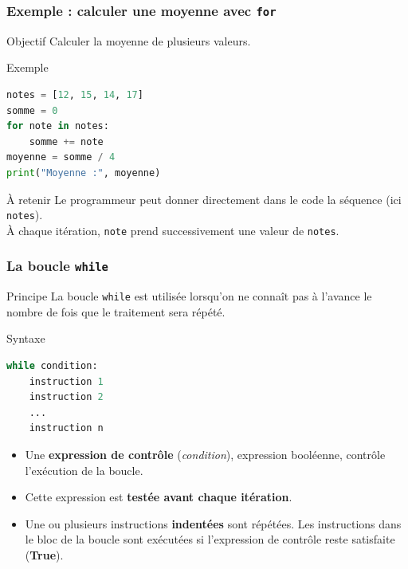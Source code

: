 \documentclass[10pt]{beamer}
\begin{document}
\begin{frame}[containsverbatim]
	\frametitle{Exemple : calculer une moyenne avec \texttt{for}}
	
	\begin{block}{Objectif}
		Calculer la moyenne de plusieurs valeurs.
	\end{block}
	
	\vspace{0.15cm}
	
	\begin{exampleblock}{Exemple}
\begin{lstlisting}[language=Python]
notes = [12, 15, 14, 17]
somme = 0
for note in notes:
	somme += note
moyenne = somme / 4
print("Moyenne :", moyenne)
\end{lstlisting}
	\end{exampleblock}
	
	\vspace{0.1cm}
	
	\begin{alertblock}{À retenir}
	Le programmeur peut donner directement dans le code la séquence (ici \texttt{notes}). \\
		À chaque itération, \texttt{note} prend successivement
		une valeur de \texttt{notes}.
	\end{alertblock}
\end{frame}

\begin{frame}[containsverbatim]
	\frametitle{La boucle \texttt{while}}
	
	\begin{block}{Principe}
		La boucle \texttt{while} est utilisée lorsqu'on ne connaît pas
		à l'avance le nombre de fois que le traitement sera répété.
	\end{block}
	
	\vspace{0.2cm}
	
	\begin{alertblock}{Syntaxe}
		\begin{lstlisting}[language=Python]
while condition:
	instruction 1
	instruction 2
	...
	instruction n
		\end{lstlisting}
	\end{alertblock}
	
	\vspace{0.1cm}
	
	\begin{itemize}
		\item Une \textbf{expression de contrôle} (\emph{condition}),
		expression booléenne, contrôle l'exécution de la boucle.
		
		\item Cette expression est \textbf{testée avant chaque itération}.
		
		\item Une ou plusieurs instructions \textbf{indentées} sont répétées.
		Les instructions dans le bloc de la boucle sont exécutées
		si l'expression de contrôle reste satisfaite (\textbf{True}).
	\end{itemize}
	
\end{frame}
\end{document}
